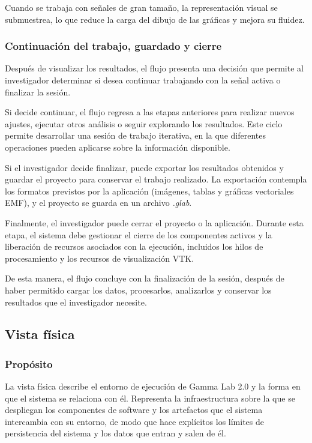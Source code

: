 \documentclass[11pt,a4paper]{article}
\DeclareRobustCommand{\_}{\textunderscore\allowbreak}
\begin{document}
Cuando se trabaja con señales de gran tamaño, la representación visual se submuestrea, lo que reduce la carga del dibujo de las gráficas y mejora su fluidez.


\subsubsection{Continuación del trabajo, guardado y cierre}
Después de visualizar los resultados, el flujo presenta una decisión que permite al investigador determinar si desea continuar trabajando con la señal activa o finalizar la sesión.

Si decide continuar, el flujo regresa a las etapas anteriores para realizar nuevos ajustes, ejecutar otros análisis o seguir explorando los resultados. Este ciclo permite desarrollar una sesión de trabajo iterativa, en la que diferentes operaciones pueden aplicarse sobre la información disponible.

Si el investigador decide finalizar, puede exportar los resultados obtenidos y guardar el proyecto para conservar el trabajo realizado. La exportación contempla los formatos previstos por la aplicación (imágenes, tablas y gráficas vectoriales EMF), y el proyecto se guarda en un archivo \textit{.glab}.

Finalmente, el investigador puede cerrar el proyecto o la aplicación. Durante esta etapa, el sistema debe gestionar el cierre de los componentes activos y la liberación de recursos asociados con la ejecución, incluidos los hilos de procesamiento y los recursos de visualización VTK.

De esta manera, el flujo concluye con la finalización de la sesión, después de haber permitido cargar los datos, procesarlos, analizarlos y conservar los resultados que el investigador necesite.


\subsection{Vista f\'isica}

\subsubsection{Propósito}

La vista física describe el entorno de ejecución de Gamma Lab 2.0 y la forma en que el sistema se relaciona con él. Representa la infraestructura sobre la que se despliegan los componentes de software y los artefactos que el sistema intercambia con su entorno, de modo que hace explícitos los límites de persistencia del sistema y los datos que entran y salen de él.
\end{document}
